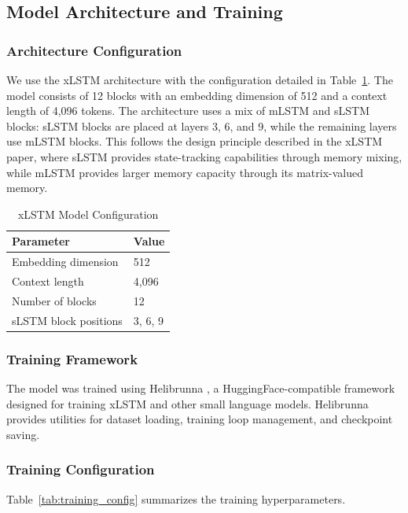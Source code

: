 \documentclass[conference]{IEEEtran}
\begin{document}
\subsection{Model Architecture and Training}
\label{sec:training}

\subsubsection{Architecture Configuration}
We use the xLSTM architecture \cite{beck2024xlstm} with the configuration detailed in Table~\ref{tab:model_config}. The model consists of 12 blocks with an embedding dimension of 512 and a context length of 4,096 tokens. The architecture uses a mix of mLSTM and sLSTM blocks: sLSTM blocks are placed at layers 3, 6, and 9, while the remaining layers use mLSTM blocks. This follows the design principle described in the xLSTM paper, where sLSTM provides state-tracking capabilities through memory mixing, while mLSTM provides larger memory capacity through its matrix-valued memory.

\begin{table}[htbp]
\centering
\caption{xLSTM Model Configuration}
\label{tab:model_config}
\begin{tabular}{ll}
\toprule
\textbf{Parameter} & \textbf{Value} \\
\midrule
Embedding dimension & 512 \\
Context length & 4,096 \\
Number of blocks & 12 \\
sLSTM block positions & 3, 6, 9 \\
\bottomrule
\end{tabular}
\end{table}

\subsubsection{Training Framework}
The model was trained using Helibrunna \cite{helibrunna}, a HuggingFace-compatible framework designed for training xLSTM and other small language models. Helibrunna provides utilities for dataset loading, training loop management, and checkpoint saving.

\subsubsection{Training Configuration}
Table~\ref{tab:training_config} summarizes the training hyperparameters.
\end{document}
